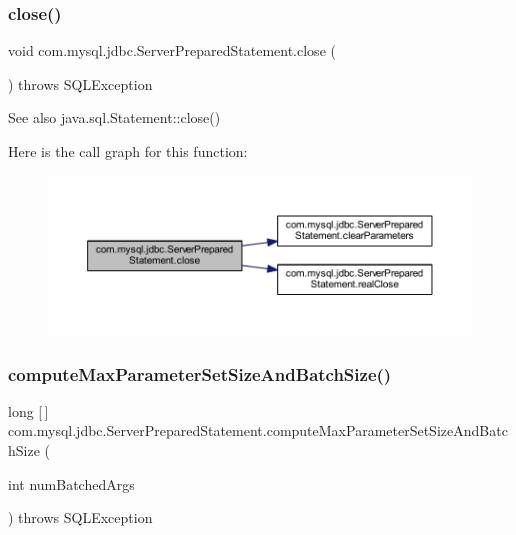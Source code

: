 \subsubsection{\texorpdfstring{close()}{close()}}
{\footnotesize\ttfamily void com.\+mysql.\+jdbc.\+Server\+Prepared\+Statement.\+close (\begin{DoxyParamCaption}{ }\end{DoxyParamCaption}) throws S\+Q\+L\+Exception}

\begin{DoxySeeAlso}{See also}
java.\+sql.\+Statement\+::close() 
\end{DoxySeeAlso}
Here is the call graph for this function\+:
\nopagebreak
\begin{figure}[H]
\begin{center}
\leavevmode
\includegraphics[width=350pt]{classcom_1_1mysql_1_1jdbc_1_1_server_prepared_statement_a2d447ecd02f6f318e320d5c33ebfa780_cgraph}
\end{center}
\end{figure}
\mbox{\label{classcom_1_1mysql_1_1jdbc_1_1_server_prepared_statement_ace22ac37c1b74c974d8adae7af09f4f5}} 
\subsubsection{\texorpdfstring{compute\+Max\+Parameter\+Set\+Size\+And\+Batch\+Size()}{computeMaxParameterSetSizeAndBatchSize()}}
{\footnotesize\ttfamily long \mbox{[}$\,$\mbox{]} com.\+mysql.\+jdbc.\+Server\+Prepared\+Statement.\+compute\+Max\+Parameter\+Set\+Size\+And\+Batch\+Size (\begin{DoxyParamCaption}\item[{int}]{num\+Batched\+Args }\end{DoxyParamCaption}) throws S\+Q\+L\+Exception\hspace{0.3cm}{\ttfamily [protected]}}

